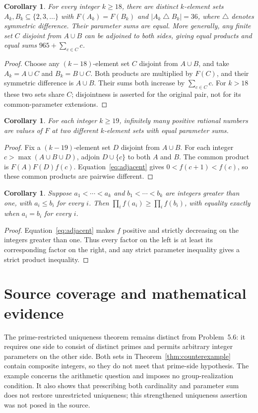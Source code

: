 \documentclass[11pt]{article}
\newtheorem{corollary}[theorem]{Corollary}
\begin{document}
\begin{corollary}\label{cor:extensions}
For every integer $k\geq18$, there are distinct $k$-element sets
$A_k,B_k\subseteq\{2,3,\ldots\}$ with $F(A_k)=F(B_k)$ and
$|A_k\mathbin{\triangle}B_k|=36$, where $\triangle$ denotes symmetric
difference. Their parameter sums are equal. More generally, any finite set
$C$ disjoint from $A\cup B$ can be adjoined to both sides, giving equal
products and equal sums $965+\sum_{c\in C}c$.
\end{corollary}
\begin{proof}
Choose any $(k-18)$-element set $C$ disjoint from $A\cup B$, and take
$A_k=A\cup C$ and $B_k=B\cup C$. Both products are multiplied by $F(C)$,
and their symmetric difference is $A\cup B$. Their sums both increase by
$\sum_{c\in C}c$. For $k>18$ these two sets share $C$; disjointness is
asserted for the original pair, not for its common-parameter extensions.
\end{proof}

\begin{corollary}\label{cor:infinite}
For each integer $k\geq19$, infinitely many positive rational numbers are
values of $F$ at two different $k$-element sets with equal parameter sums.
\end{corollary}
\begin{proof}
Fix a $(k-19)$-element set $D$ disjoint from $A\cup B$. For each integer
$c>\max(A\cup B\cup D)$, adjoin $D\cup\{c\}$ to both $A$ and $B$.
The common product is $F(A)F(D)f(c)$. Equation~\eqref{eq:adjacent} gives
$0<f(c+1)<f(c)$, so these common products are pairwise different.
\end{proof}

\begin{corollary}\label{cor:comparable}
Suppose $a_1<\cdots<a_k$ and $b_1<\cdots<b_k$ are integers greater than
one, with $a_i\leq b_i$ for every $i$. Then
$\prod_i f(a_i)\geq\prod_i f(b_i)$, with equality exactly when
$a_i=b_i$ for every $i$.
\end{corollary}
\begin{proof}
Equation~\eqref{eq:adjacent} makes $f$ positive and strictly decreasing
on the integers greater than one. Thus every factor on the left is at
least its corresponding factor on the right, and any strict parameter
inequality gives a strict product inequality.
\end{proof}

\section{Source coverage and mathematical evidence}
The prime-restricted uniqueness theorem
\cite[Theorem~4.6, p.~1263]{ALM} remains distinct from Problem~5.6:
it requires one side to consist of distinct primes and permits arbitrary
integer parameters on the other side. Both sets in
Theorem~\ref{thm:counterexample} contain composite integers, so they do not
meet that prime-side hypothesis. The example concerns the arithmetic
question and imposes no group-realization condition. It also shows that
prescribing both cardinality and parameter sum does not restore unrestricted
uniqueness; this strengthened uniqueness assertion was not posed in the source.
\end{document}
